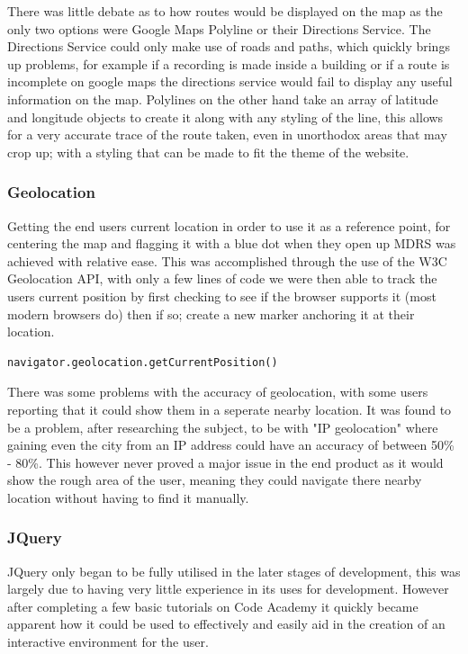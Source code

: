 \documentclass{l3proj}
\begin{document}
There was little debate as to how routes would be displayed on the map as the only two options were Google Maps Polyline or their Directions Service. The Directions Service could only make use of roads and paths, which quickly brings up problems, for example if a recording is made inside a building or if a route is incomplete on google maps the directions service would fail to display any useful information on the map. Polylines on the other hand take an array of latitude and longitude objects to create it along with any styling of the line, this allows for a very accurate trace of the route taken, even in unorthodox areas that may crop up; with a styling that can be made to fit the theme of the website.

\subsubsection{Geolocation}		Getting the end users current location in order to use it as a reference point, for centering the map and flagging it with a blue dot when they open up MDRS was achieved with relative ease. This was accomplished through the use of the \gls{W3C} Geolocation \gls{API}, with only a few lines of code we were then able to track the users current position by first checking to see if the browser supports it (most modern browsers do) then if so; create a new marker anchoring it at their location.
\begin{verbatim}
navigator.geolocation.getCurrentPosition()
\end{verbatim}
There was some problems with the accuracy of geolocation, with some users reporting that it could show them in a seperate nearby location. It was found to be a problem, after researching the subject\cite{geolocation}, to be with "IP geolocation" where gaining even the city from an IP address could have an accuracy of between 50\% - 80\%. This however never proved a major issue in the end product as it would show the rough area of the user, meaning they could navigate there nearby location without having to find it manually.

\subsubsection{JQuery}		\gls{JQuery} only began to be fully utilised in the later stages of development, this was largely due to having very little experience in its uses for development. However after completing a few basic tutorials on Code Academy\cite{codeacademy} it quickly became apparent how it could be used to effectively and easily aid in the creation of an interactive environment for the user.
\end{document}
